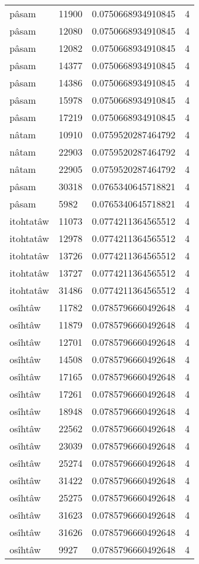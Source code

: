 \begin{longtable}{llll}
pâsam & 11900 & 0.0750668934910845 & 4 \\
pâsam & 12080 & 0.0750668934910845 & 4 \\
pâsam & 12082 & 0.0750668934910845 & 4 \\
pâsam & 14377 & 0.0750668934910845 & 4 \\
pâsam & 14386 & 0.0750668934910845 & 4 \\
pâsam & 15978 & 0.0750668934910845 & 4 \\
pâsam & 17219 & 0.0750668934910845 & 4 \\
nâtam & 10910 & 0.0759520287464792 & 4 \\
nâtam & 22903 & 0.0759520287464792 & 4 \\
nâtam & 22905 & 0.0759520287464792 & 4 \\
pâsam & 30318 & 0.0765340645718821 & 4 \\
pâsam & 5982 & 0.0765340645718821 & 4 \\
itohtatâw & 11073 & 0.0774211364565512 & 4 \\
itohtatâw & 12978 & 0.0774211364565512 & 4 \\
itohtatâw & 13726 & 0.0774211364565512 & 4 \\
itohtatâw & 13727 & 0.0774211364565512 & 4 \\
itohtatâw & 31486 & 0.0774211364565512 & 4 \\
osîhtâw & 11782 & 0.0785796660492648 & 4 \\
osîhtâw & 11879 & 0.0785796660492648 & 4 \\
osîhtâw & 12701 & 0.0785796660492648 & 4 \\
osîhtâw & 14508 & 0.0785796660492648 & 4 \\
osîhtâw & 17165 & 0.0785796660492648 & 4 \\
osîhtâw & 17261 & 0.0785796660492648 & 4 \\
osîhtâw & 18948 & 0.0785796660492648 & 4 \\
osîhtâw & 22562 & 0.0785796660492648 & 4 \\
osîhtâw & 23039 & 0.0785796660492648 & 4 \\
osîhtâw & 25274 & 0.0785796660492648 & 4 \\
osîhtâw & 31422 & 0.0785796660492648 & 4 \\
osîhtâw & 25275 & 0.0785796660492648 & 4 \\
osîhtâw & 31623 & 0.0785796660492648 & 4 \\
osîhtâw & 31626 & 0.0785796660492648 & 4 \\
osîhtâw & 9927 & 0.0785796660492648 & 4 \\

\end{longtable}
